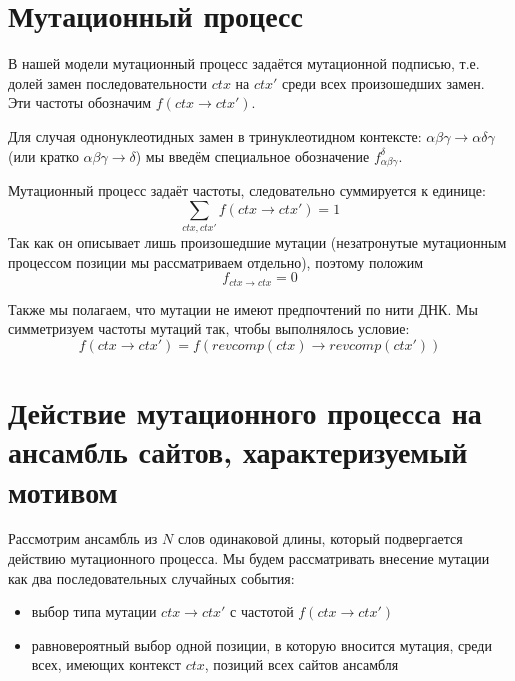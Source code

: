 \documentclass[a4paper]{article}
\begin{document}

\section{Мутационный процесс}

В нашей модели мутационный процесс задаётся мутационной подписью, т.е. долей замен последовательности $ctx$ на $ctx'$ среди всех произошедших замен. Эти частоты обозначим $f(ctx \to ctx')$. 

Для случая однонуклеотидных замен в тринуклеотидном контексте: $\alpha\beta\gamma\to\alpha\delta\gamma$ (или кратко $\alpha\beta\gamma\to\delta$) мы введём специальное обозначение $f_{\alpha\beta\gamma}^{\delta}$.

Мутационный процесс задаёт частоты, следовательно суммируется к единице:
\begin{equation}
\sum_{ctx,ctx'} f(ctx\to ctx') = 1
\end{equation}
Так как он описывает лишь произошедшие мутации (незатронутые мутационным процессом позиции мы рассматриваем отдельно), поэтому положим 
\begin{equation}
f_{ctx\to ctx} = 0
\end{equation}

Также мы полагаем, что мутации не имеют предпочтений по нити ДНК. Мы симметризуем частоты мутаций так, чтобы выполнялось условие:
\begin{equation}
f(ctx\to ctx') = f(revcomp(ctx)\to revcomp(ctx'))
\end{equation}



\section{Действие мутационного процесса на ансамбль сайтов, характеризуемый мотивом}

Рассмотрим ансамбль из $N$ слов одинаковой длины, который подвергается действию мутационного процесса. Мы будем рассматривать внесение мутации как два последовательных случайных события:
\begin{itemize}
\item выбор типа мутации $ctx \to ctx'$ с частотой $f(ctx \to ctx')$
\item равновероятный выбор одной позиции, в которую вносится мутация, среди всех, имеющих контекст $ctx$, позиций всех сайтов ансамбля
\end{itemize}
\end{document}
